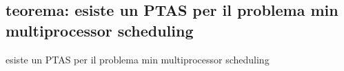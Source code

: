 
\subsection*{teorema: esiste un PTAS per il problema min multiprocessor scheduling}
\begin{flushleft}
	esiste un PTAS per il problema min multiprocessor scheduling
\end{flushleft}


\newpage
